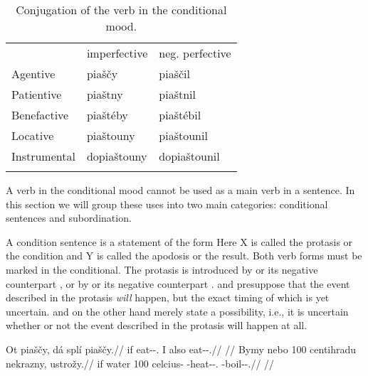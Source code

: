 \begin{table}
    \footnotesize\sffamily
		\caption{Conjugation of the verb  in the conditional mood.}
		\label{tbl:conditional}
		\medskip
    \begin{tabu}to 0.7
         \toprule \addlinespace
         &{\sc imperfective}&{\sc neg. perfective}  \\ \addlinespace
         \midrule \addlinespace
         Agentive &
         {piaščy} &
		 {piaščil} \\ \addlinespace

         Patientive &
         {piaštny}&
         {piaštnil}\\ \addlinespace

         Benefactive &
         {piaštéby} &
		 {piaštébil}\\ \addlinespace

         Locative &
         {piaštouny} &
		 {piaštounil}\\ \addlinespace

         Instrumental &
         {dopiaštouny} &
		 {dopiaštounil}\\ \addlinespace

         \bottomrule
    \end{tabu}

\end{table}

A verb in the conditional mood cannot be used as a main verb in a sentence. In this section we will group these uses into two main categories: conditional sentences and subordination.

A condition sentence is a statement of the form  Here X is
called the protasis or the condition and Y is called the apodosis or the result.
Both verb forms must be marked in the conditional. The protasis is introduced by
 or its negative counterpart , or by
 or its negative counterpart .  and
 presuppose that the event described in the protasis \emph{will}
happen, but the exact timing of which is yet uncertain.  and 
on the other hand merely state a possibility, i.e., it is uncertain whether or
not the event described in the protasis will happen at all.

\pex
	\a
	\begingl
		\gla Ot piaščy, dá splí piaščy.//
		\glb if eat-\Av{}-\Cond{}.\Ipf{} I also eat-\Av{}-\Cond{}.\Ipf{}//
		\glft {}//
	\endgl
	\a
	\begingl
		\gla Bymy nebo 100 centihradu nekrazny, ustrožy.//
		\glb if water 100 celcius-\Ins{} \Caus{}-heat-\Pv{}-\Cond{}.\Ipf{} \Refl{}-boil-\Av{}-\Cond{}.\Ipf{}//
		\glft {}//
	\endgl
\xe


